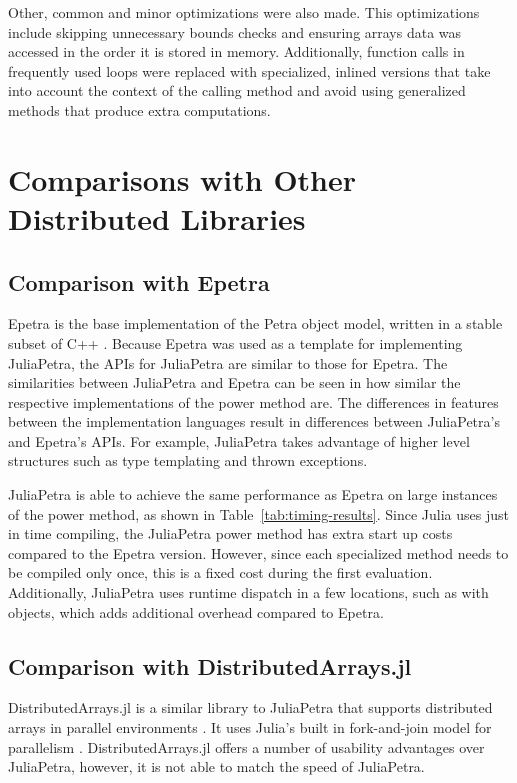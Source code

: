 \documentclass[acmsmall]{acmart}
\newcommand{\snippet}[1]{\texttt{\detokenize{#1}}}
\begin{document}
	Other, common and minor optimizations were also made.
	This optimizations include skipping unnecessary bounds checks
	and ensuring arrays data was accessed in the order it is stored in memory.
	Additionally, function calls in frequently used loops were replaced with specialized, inlined versions
	that take into account the context of the calling method
	and avoid using generalized methods that produce extra computations.
	
	\section{Comparisons with Other Distributed Libraries}
	
	\subsection{Comparison with Epetra}
	
	Epetra is the base implementation of the Petra object model,
	written in a stable subset of C++ \cite{Heroux:2005:Trilinos}.
	Because Epetra was used as a template for implementing JuliaPetra,
	the APIs for JuliaPetra are similar to those for Epetra.
	The similarities between JuliaPetra and Epetra can be seen in how similar the respective implementations
	of the power method are.
	The differences in features between the implementation languages result in differences
	between JuliaPetra's and Epetra's APIs.
	For example, JuliaPetra takes advantage of higher level structures
	such as type templating and thrown exceptions.
	
	JuliaPetra is able to achieve the same performance as Epetra on large instances of the power method,
	as shown in Table~\ref{tab:timing-results}.
	Since Julia uses just in time compiling, the JuliaPetra power method has extra start up costs compared to
	the Epetra version. However, since each specialized method needs to be compiled only once,
	this is a fixed cost during the first evaluation.
	Additionally, JuliaPetra uses runtime dispatch in a few locations, such as with
	\snippet{Comm} objects, which adds additional overhead compared to Epetra.
	
	\subsection{Comparison with DistributedArrays.jl}
	
	DistributedArrays.jl is a similar library to JuliaPetra that supports
	distributed arrays in parallel environments \cite{Github:DA}.
	It uses Julia's built in fork-and-join model for parallelism
	\cite{Bezanson:2017:FreshApproach}.
	DistributedArrays.jl offers a number of usability advantages over JuliaPetra, however, it is not able to match the speed of JuliaPetra.
	
\end{document}
